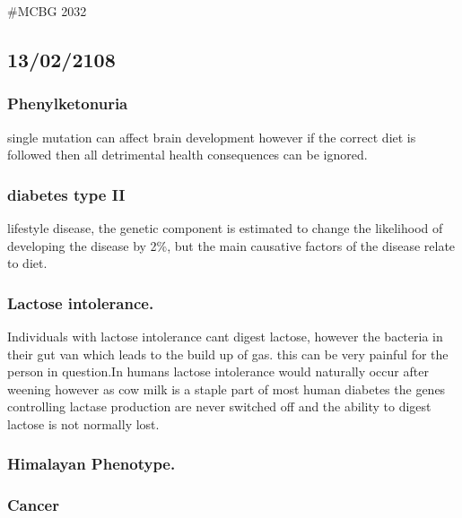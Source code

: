 \documentclass[]{article}
\date{}
\begin{document}
\#MCBG 2032

\hypertarget{section}{%
\subsection{13/02/2108}\label{section}}

\hypertarget{phenylketonuria}{%
\subsubsection{Phenylketonuria}\label{phenylketonuria}}

single mutation can affect brain development however if the correct diet
is followed then all detrimental health consequences can be ignored.

\hypertarget{diabetes-type-ii}{%
\subsubsection{diabetes type II}\label{diabetes-type-ii}}

lifestyle disease, the genetic component is estimated to change the
likelihood of developing the disease by 2\%, but the main causative
factors of the disease relate to diet.

\hypertarget{lactose-intolerance.}{%
\subsubsection{Lactose intolerance.}\label{lactose-intolerance.}}

Individuals with lactose intolerance cant digest lactose, however the
bacteria in their gut van which leads to the build up of gas. this can
be very painful for the person in question.In humans lactose intolerance
would naturally occur after weening however as cow milk is a staple part
of most human diabetes the genes controlling lactase production are
never switched off and the ability to digest lactose is not normally
lost.

\hypertarget{himalayan-phenotype.}{%
\subsubsection{Himalayan Phenotype.}\label{himalayan-phenotype.}}

\hypertarget{cancer}{%
\subsubsection{Cancer}\label{cancer}}
\end{document}
